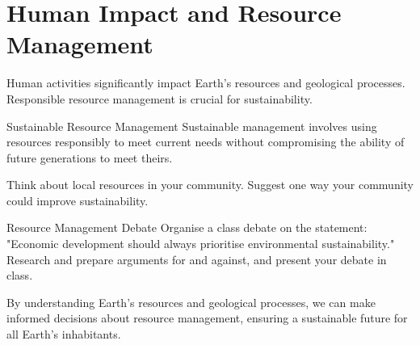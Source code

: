 \section{Human Impact and Resource Management}

Human activities significantly impact Earth's resources and geological processes. Responsible resource management is crucial for sustainability.

\begin{keyconcept}{Sustainable Resource Management}
Sustainable management involves using resources responsibly to meet current needs without compromising the ability of future generations to meet theirs.
\end{keyconcept}

\begin{stopandthink}
Think about local resources in your community. Suggest one way your community could improve sustainability.
\end{stopandthink}

\begin{investigation}{Resource Management Debate}
Organise a class debate on the statement: "Economic development should always prioritise environmental sustainability." Research and prepare arguments for and against, and present your debate in class.
\end{investigation}

By understanding Earth's resources and geological processes, we can make informed decisions about resource management, ensuring a sustainable future for all Earth's inhabitants.